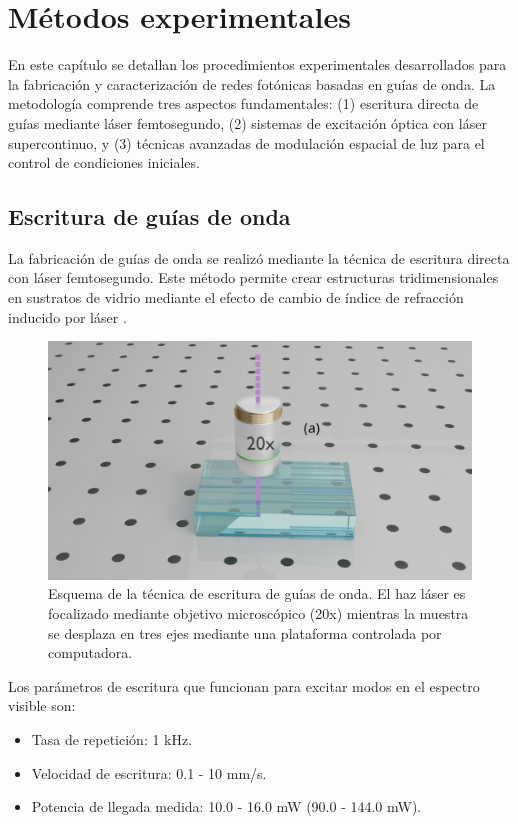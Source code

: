 \chapter{Métodos experimentales}

En este capítulo se detallan los procedimientos experimentales desarrollados para la fabricación y caracterización de redes fotónicas basadas en guías de onda. La metodología comprende tres aspectos fundamentales: (1) escritura directa de guías mediante láser femtosegundo, (2) sistemas de excitación óptica con láser supercontinuo, y (3) técnicas avanzadas de modulación espacial de luz para el control de condiciones iniciales.


\section{Escritura de guías de onda \label{cap:fs}}

La fabricación de guías de onda se realizó mediante la técnica de escritura directa con láser femtosegundo. Este método permite crear estructuras tridimensionales en sustratos de vidrio mediante el efecto de cambio de índice de refracción inducido por láser \citep{femto_writing}.

\begin{figure}[H]
    \centering
    \includegraphics[width=0.6\linewidth, trim={18cm 4cm 15cm 6cm},clip]{media/fabrication}
    \caption[Esquema de la técnica de escritura de guías de onda.]{Esquema de la técnica de escritura de guías de onda. El haz láser es focalizado mediante objetivo microscópico (20x) mientras la muestra se desplaza en tres ejes mediante una plataforma controlada por computadora.}
\end{figure}

Los parámetros de escritura que funcionan para excitar modos en el espectro visible son:
\begin{itemize}
    \item Tasa de repetición: 1 kHz.
    \item Velocidad de escritura: 0.1 - 10 mm/s.
    \item Potencia de llegada medida: 10.0 - 16.0 mW (90.0 - 144.0 mW).
\end{itemize}

